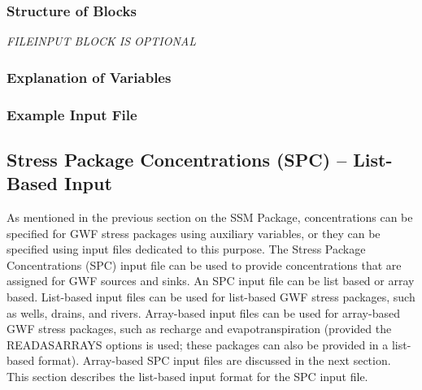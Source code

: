 \vspace{5mm}
\subsubsection{Structure of Blocks}


\vspace{5mm}
\noindent \textit{FILEINPUT BLOCK IS OPTIONAL}


\vspace{5mm}
\subsubsection{Explanation of Variables}
\begin{description}

\end{description}

\vspace{5mm}
\subsubsection{Example Input File}



\newpage
\subsection{Stress Package Concentrations (SPC) -- List-Based Input}
As mentioned in the previous section on the SSM Package, concentrations can be specified for GWF stress packages using auxiliary variables, or they can be specified using input files dedicated to this purpose.  The Stress Package Concentrations (SPC) input file can be used to provide concentrations that are assigned for GWF sources and sinks.  An SPC input file can be list based or array based.  List-based input files can be used for list-based GWF stress packages, such as wells, drains, and rivers.  Array-based input files can be used for array-based GWF stress packages, such as recharge and evapotranspiration (provided the READASARRAYS options is used; these packages can also be provided in a list-based format).  Array-based SPC input files are discussed in the next section.  This section describes the list-based input format for the SPC input file.  

